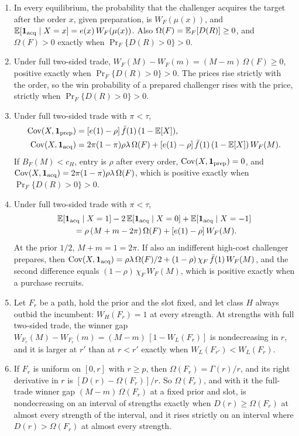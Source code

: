 \begin{proposition}\label{prop:winner}
\leavevmode
\begin{enumerate}[label=(\roman*),leftmargin=2em]
\item In every equilibrium, the probability that the challenger acquires the target after the order \(x\), given
preparation, is \(W_F(\mu(x))\), and \(\mathbb{E}[\mathbf{1}_{\rm acq}\mid X=x]=e(x)\,W_F(\mu(x))\). Also
\(\Omega(F)=\mathbb{E}_F[D(R)]\ge0\), and \(\Omega(F)>0\) exactly when \(\Pr_F\{D(R)>0\}>0\).
\item Under full two-sided trade, \(W_F(M)-W_F(m)=(M-m)\,\Omega(F)\ge0\), positive exactly when
\(\Pr_F\{D(R)>0\}>0\). The prices rise strictly with the order, so the win probability of a prepared challenger
rises with the price, strictly when \(\Pr_F\{D(R)>0\}>0\).
\item Under full two-sided trade with \(\pi<\tau\),
\[
\begin{aligned}
\operatorname{Cov}(X,\mathbf{1}_{\rm prep})&=[e(1)-\rho]\,\bar f(1)\,(1-\mathbb{E}[X]),\\
\operatorname{Cov}(X,\mathbf{1}_{\rm acq})&=2\pi(1-\pi)\rho\lambda\,\Omega(F)+[e(1)-\rho]\,\bar f(1)\,(1-\mathbb{E}[X])\,W_F(M).
\end{aligned}
\]
If \(B_F(M)<c_H\), entry is \(\rho\) after every order, \(\operatorname{Cov}(X,\mathbf{1}_{\rm prep})=0\), and
\(\operatorname{Cov}(X,\mathbf{1}_{\rm acq})=2\pi(1-\pi)\rho\lambda\,\Omega(F)\), which is positive exactly when \(\Pr_F\{D(R)>0\}>0\).
\item Under full two-sided trade with \(\pi<\tau\),
\[
\begin{aligned}
&\mathbb{E}[\mathbf{1}_{\rm acq}\mid X=1]-2\,\mathbb{E}[\mathbf{1}_{\rm acq}\mid X=0]+\mathbb{E}[\mathbf{1}_{\rm acq}\mid X=-1]\\
&\qquad=\rho\,(M+m-2\pi)\,\Omega(F)+[e(1)-\rho]\,W_F(M).
\end{aligned}
\]
At the prior \(1/2\), \(M+m=1=2\pi\). If also an indifferent high-cost challenger prepares, then
\(\operatorname{Cov}(X,\mathbf{1}_{\rm acq})=\rho\lambda\,\Omega(F)/2+(1-\rho)\,\chi_F\,\bar f(1)\,W_F(M)\), and the second difference
equals \((1-\rho)\,\chi_F\,W_F(M)\), which is positive exactly when a purchase recruits.
\item Let \(F_r\) be a path, hold the prior and the slot fixed, and let class \(H\) always outbid the incumbent:
\(W_H(F_r)=1\) at every strength. At strengths with full two-sided trade, the winner gap
\(W_{F_r}(M)-W_{F_r}(m)=(M-m)\,[1-W_L(F_r)]\) is nondecreasing in \(r\), and it is larger at \(r'\) than at
\(r<r'\) exactly when \(W_L(F_{r'})<W_L(F_r)\).
\item If \(F_r\) is uniform on \([0,r]\) with \(r\ge p\), then \(\Omega(F_r)=\Gamma(r)/r\), and its right derivative
in \(r\) is \([D(r)-\Omega(F_r)]/r\). So \(\Omega(F_r)\), and with it the full-trade winner gap
\((M-m)\,\Omega(F_r)\) at a fixed prior and slot, is nondecreasing on an interval of strengths exactly when
\(D(r)\ge\Omega(F_r)\) at almost every strength of the interval, and it rises strictly on an interval where
\(D(r)>\Omega(F_r)\) at almost every strength.
\end{enumerate}
\end{proposition}

